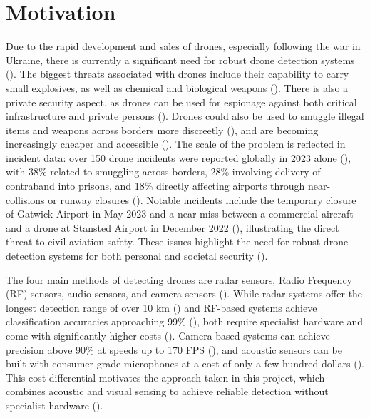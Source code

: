 \section{Motivation}


Due to the rapid development and sales of drones, especially following the war in 
Ukraine, there is currently a significant need for robust drone detection systems 
(\cite{macedo2025drone}). The biggest threats associated with drones include their 
capability to carry small explosives, as well as chemical and biological weapons 
(\cite{seidaliyeva2024advances}). There is also a private security aspect, as drones 
can be used for espionage against both critical infrastructure and private persons 
(\cite{seidaliyeva2024advances}). Drones could also be used to smuggle illegal items 
and weapons across borders more discreetly (\cite{seidaliyeva2024advances}), and are 
becoming increasingly cheaper and accessible (\cite{seidaliyeva2024advances}). The 
scale of the problem is reflected in incident data: over 150 drone incidents were 
reported globally in 2023 alone (\cite{seidaliyeva2024advances}), with 38\% related 
to smuggling across borders, 28\% involving delivery of contraband into prisons, and 
18\% directly affecting airports through near-collisions or runway closures 
(\cite{seidaliyeva2024advances}). Notable incidents include the temporary closure of 
Gatwick Airport in May 2023 and a near-miss between a commercial aircraft and a drone 
at Stansted Airport in December 2022 (\cite{seidaliyeva2024advances}), illustrating 
the direct threat to civil aviation safety. These issues highlight the need for robust 
drone detection systems for both personal and societal security 
(\cite{seidaliyeva2024advances, macedo2025drone}).

 \vspace{1em}

The four main methods of detecting drones are radar sensors, Radio Frequency (RF) 
sensors, audio sensors, and camera sensors (\cite{seidaliyeva2024advances}). While 
radar systems offer the longest detection range of over 10 km (\cite{macedo2025drone}) 
and RF-based systems achieve classification accuracies approaching 99\% 
(\cite{macedo2025drone}), both require specialist hardware and come with significantly 
higher costs (\cite{macedo2025drone}). Camera-based systems can achieve precision 
above 90\% at speeds up to 170 FPS (\cite{macedo2025drone}), and acoustic sensors 
can be built with consumer-grade microphones at a cost of only a few hundred dollars 
(\cite{macedo2025drone}). This cost differential motivates the approach taken in this 
project, which combines acoustic and visual sensing to achieve reliable detection 
without specialist hardware (\cite{macedo2025drone, seidaliyeva2024advances}).

